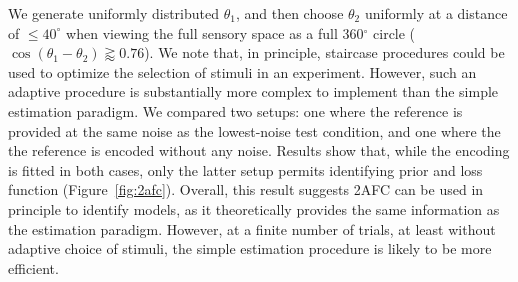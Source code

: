 \documentclass[si.tex]{subfiles}
\begin{document}
We generate uniformly distributed $\theta_1$, and then choose $\theta_2$ uniformly at a distance of $\leq 40^\circ$ when viewing the full sensory space as a full 360$^\circ$ circle ($\cos(\theta_1-\theta_2) \gtrapprox 0.76$).
We note that, in principle, staircase procedures could be used to optimize the selection of stimuli in an experiment. However, such an adaptive procedure is substantially more complex to implement than the simple estimation paradigm.
We compared two setups: one where the reference is provided at the same noise as the lowest-noise test condition, and one where the the reference is encoded without any noise. Results show that, while the encoding is fitted in both cases, only the latter setup permits identifying prior and loss function (Figure~\ref{fig:2afc}). Overall, this result suggests 2AFC can be used in principle to identify models, as it theoretically provides the same information as the estimation paradigm. However, at a finite number of trials, at least without adaptive choice of stimuli, the simple estimation procedure is likely to be more efficient.
\end{document}
